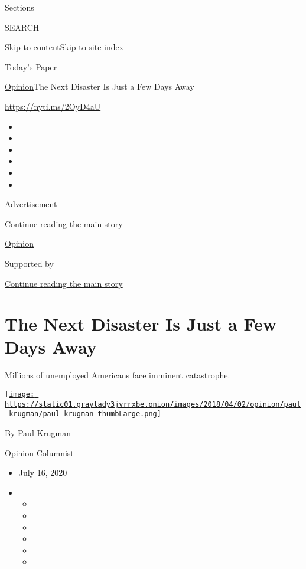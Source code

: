Sections

SEARCH

\protect\hyperlink{site-content}{Skip to
content}\protect\hyperlink{site-index}{Skip to site index}

\href{https://myaccount.nytimes3xbfgragh.onion/auth/login?response_type=cookie\&client_id=vi}{}

\href{https://www.nytimes3xbfgragh.onion/section/todayspaper}{Today's
Paper}

\href{/section/opinion}{Opinion}\textbar{}The Next Disaster Is Just a
Few Days Away

\href{https://nyti.ms/2OyD4aU}{https://nyti.ms/2OyD4aU}

\begin{itemize}
\item
\item
\item
\item
\item
\item
\end{itemize}

Advertisement

\protect\hyperlink{after-top}{Continue reading the main story}

\href{/section/opinion}{Opinion}

Supported by

\protect\hyperlink{after-sponsor}{Continue reading the main story}

\hypertarget{the-next-disaster-is-just-a-few-days-away}{%
\section{The Next Disaster Is Just a Few Days
Away}\label{the-next-disaster-is-just-a-few-days-away}}

Millions of unemployed Americans face imminent catastrophe.

\href{https://www.nytimes3xbfgragh.onion/by/paul-krugman}{\texttt{[image: https://static01.graylady3jvrrxbe.onion/images/2018/04/02/opinion/paul-krugman/paul-krugman-thumbLarge.png]}}

By \href{https://www.nytimes3xbfgragh.onion/by/paul-krugman}{Paul
Krugman}

Opinion Columnist

\begin{itemize}
\item
  July 16, 2020
\item
  \begin{itemize}
  \item
  \item
  \item
  \item
  \item
  \item
  \end{itemize}
\end{itemize}


